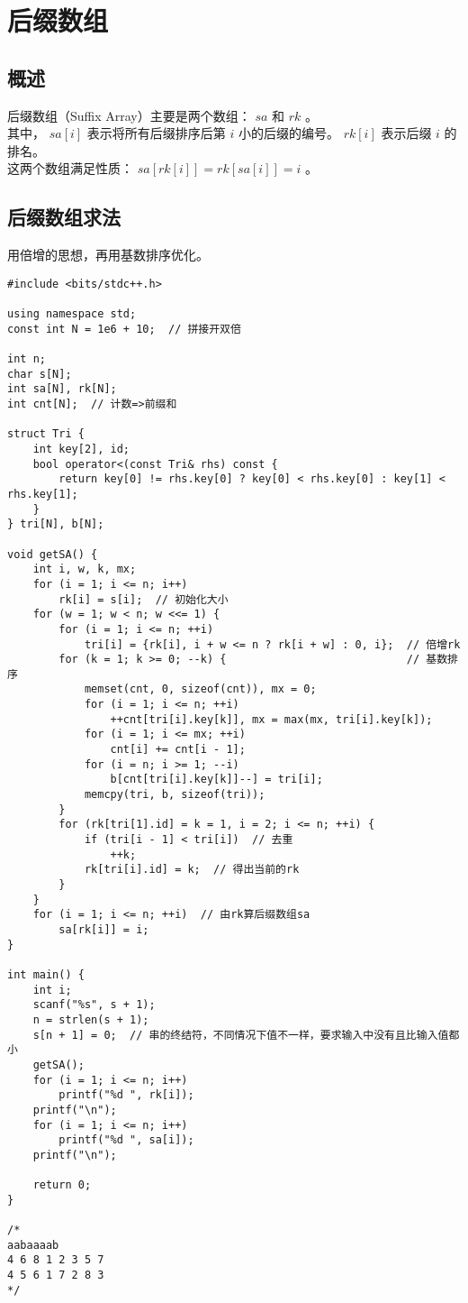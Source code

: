 \section{后缀数组}
    \subsection{概述}
        后缀数组（Suffix Array）主要是两个数组： $sa$ 和 $rk$ 。\\
        其中， $sa[i]$ 表示将所有后缀排序后第 $i$ 小的后缀的编号。 $rk[i]$ 表示后缀 $i$ 的排名。\\
        这两个数组满足性质： $sa[rk[i]]=rk[sa[i]]=i$ 。
    \subsection{后缀数组求法}
        用倍增的思想，再用基数排序优化。
\begin{lstlisting}
#include <bits/stdc++.h>

using namespace std;
const int N = 1e6 + 10;  // 拼接开双倍

int n;
char s[N];
int sa[N], rk[N];
int cnt[N];  // 计数=>前缀和

struct Tri {
    int key[2], id;
    bool operator<(const Tri& rhs) const {
        return key[0] != rhs.key[0] ? key[0] < rhs.key[0] : key[1] < rhs.key[1];
    }
} tri[N], b[N];

void getSA() {
    int i, w, k, mx;
    for (i = 1; i <= n; i++)
        rk[i] = s[i];  // 初始化大小
    for (w = 1; w < n; w <<= 1) {
        for (i = 1; i <= n; ++i)
            tri[i] = {rk[i], i + w <= n ? rk[i + w] : 0, i};  // 倍增rk
        for (k = 1; k >= 0; --k) {                            // 基数排序
            memset(cnt, 0, sizeof(cnt)), mx = 0;
            for (i = 1; i <= n; ++i)
                ++cnt[tri[i].key[k]], mx = max(mx, tri[i].key[k]);
            for (i = 1; i <= mx; ++i)
                cnt[i] += cnt[i - 1];
            for (i = n; i >= 1; --i)
                b[cnt[tri[i].key[k]]--] = tri[i];
            memcpy(tri, b, sizeof(tri));
        }
        for (rk[tri[1].id] = k = 1, i = 2; i <= n; ++i) {
            if (tri[i - 1] < tri[i])  // 去重
                ++k;
            rk[tri[i].id] = k;  // 得出当前的rk
        }
    }
    for (i = 1; i <= n; ++i)  // 由rk算后缀数组sa
        sa[rk[i]] = i;
}

int main() {
    int i;
    scanf("%s", s + 1);
    n = strlen(s + 1);
    s[n + 1] = 0;  // 串的终结符，不同情况下值不一样，要求输入中没有且比输入值都小
    getSA();
    for (i = 1; i <= n; i++)
        printf("%d ", rk[i]);
    printf("\n");
    for (i = 1; i <= n; i++)
        printf("%d ", sa[i]);
    printf("\n");

    return 0;
}

/*
aabaaaab
4 6 8 1 2 3 5 7 
4 5 6 1 7 2 8 3 
*/
\end{lstlisting}
